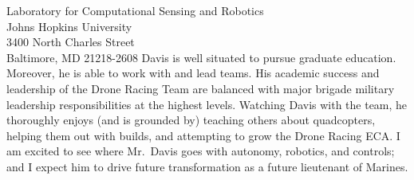 \documentclass[10pt]{wrceletter}
\begin{document}
\begin{letter}{%
Laboratory for Computational Sensing and Robotics\\
Johns Hopkins University\\
3400 North Charles Street\\
Baltimore, MD 21218-2608}
Davis is well situated to pursue graduate education. Moreover, he is able to work with and lead teams.  His academic success and leadership of the Drone Racing Team are balanced with major brigade military leadership responsibilities at the highest levels. Watching Davis with the team, he thoroughly enjoys (and is grounded by) teaching others about quadcopters, helping them out with builds, and attempting to grow the Drone Racing ECA.  I am excited to see where Mr.~Davis goes with autonomy, robotics, and controls; and I expect him to drive future transformation as a future lieutenant of Marines.

\closing{~} %

\end{letter}
\end{document}
